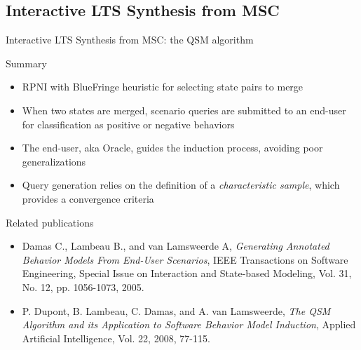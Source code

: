 \subsection{Interactive LTS Synthesis from MSC}
\begin{frame}{Interactive LTS Synthesis from MSC: the QSM algorithm}
	\begin{block}{Summary}
		\begin{itemize}
			\item RPNI with BlueFringe heuristic for selecting state pairs to merge
			\item When two states are merged, scenario queries are submitted to an end-user for classification as positive or negative behaviors
			\item The end-user, aka Oracle, guides the induction process, avoiding poor generalizations
			\item Query generation relies on the definition of a \emph{characteristic sample}, which provides a convergence criteria
		\end{itemize}
	\end{block}
	\begin{block}{Related publications}
   		\scriptsize
		\begin{itemize}
			\item Damas C., Lambeau B., and van Lamsweerde A, \emph{Generating Annotated Behavior Models From End-User Scenarios},
			     	IEEE Transactions on Software Engineering, Special Issue on Interaction and State-based Modeling, Vol. 31, No. 12, pp. 1056-1073, 2005.
			\item P. Dupont, B. Lambeau, C. Damas, and A. van Lamsweerde, \emph{The QSM Algorithm and its Application to Software Behavior Model Induction},
         		                   Applied Artificial Intelligence, Vol. 22, 2008, 77-115.
		\end{itemize}
	   \end{block}
\end{frame}

